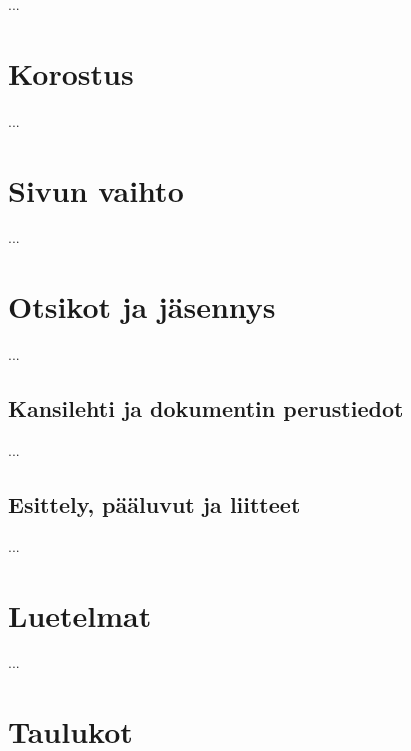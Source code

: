 ...

\section{Korostus}

...

\section{Sivun vaihto}

...

\section{Otsikot ja jäsennys}
\label{luku:otsikot}

%

...

\subsection{Kansilehti ja dokumentin perustiedot}
\label{luku:kansilehti}

...

\subsection{Esittely, pääluvut ja liitteet}
\label{luku:frontmainbackmatter}


...

\section{Luetelmat}
\label{luku:luetelmat}

...

\section{Taulukot}
\label{luku:taulukot}

